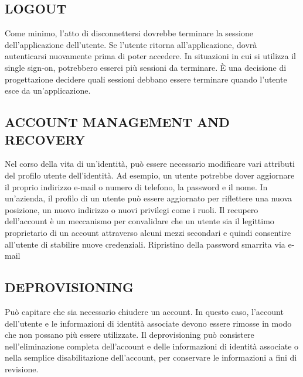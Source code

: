\subsection{LOGOUT}

Come minimo, l'atto di disconnettersi dovrebbe terminare la sessione
dell'applicazione dell'utente.
Se l'utente ritorna all'applicazione, dovrà autenticarsi nuovamente prima di
poter accedere.
In situazioni in cui si utilizza il single sign-on, potrebbero esserci più
sessioni da terminare.
È una decisione di progettazione decidere quali sessioni debbano essere
terminare quando l'utente esce da un'applicazione.

\subsection{ACCOUNT MANAGEMENT AND RECOVERY}

Nel corso della vita di un'identità, può essere necessario modificare vari
attributi del profilo utente dell'identità.
Ad esempio, un utente potrebbe dover aggiornare il proprio indirizzo e-mail o
numero di telefono, la password e il nome.
In un'azienda, il profilo di un utente può essere aggiornato per riflettere una
nuova posizione, un nuovo indirizzo o nuovi privilegi come i ruoli.
Il recupero dell'account è un meccanismo per convalidare che un utente sia il
legittimo proprietario di un account attraverso alcuni mezzi secondari e quindi
consentire all'utente di stabilire nuove credenziali.
Ripristino della password smarrita via e-mail

\subsection{DEPROVISIONING}

Può capitare che sia necessario chiudere un account.
In questo caso, l'account dell'utente e le informazioni di identità associate
devono essere rimosse in modo che non possano più essere utilizzate.
Il deprovisioning può consistere nell'eliminazione completa dell'account e delle
informazioni di identità associate o nella semplice disabilitazione dell'account,
per conservare le informazioni a fini di revisione.